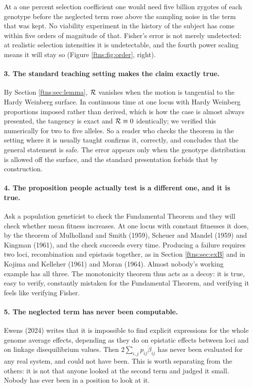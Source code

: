 At a one percent selection coefficient one would need five billion zygotes of each genotype before
the neglected term rose above the sampling noise in the term that was kept. No viability experiment
in the history of the subject has come within five orders of magnitude of that. Fisher's error is
not merely undetected: at realistic selection intensities it is undetectable, and the fourth power
scaling means it will stay so (Figure \ref{ftns:fig:order}, right).

\paragraph{3. The standard teaching setting makes the claim exactly true.}
By Section \ref{ftns:sec:lemma}, $\mathcal{R}$ vanishes when the motion is tangential to the Hardy Weinberg
surface. In continuous time at one locus with Hardy Weinberg proportions imposed rather than
derived, which is how the case is almost always presented, the tangency is exact and $\mathcal{R}\equiv0$
identically; we verified this numerically for two to five alleles. So a reader who checks the
theorem in the setting where it is usually taught confirms it, correctly, and concludes that the
general statement is safe. The error appears only when the genotype distribution is allowed off the
surface, and the standard presentation forbids that by construction.

\paragraph{4. The proposition people actually test is a different one, and it is true.}
Ask a population geneticist to check the Fundamental Theorem and they will check whether mean
fitness increases. At one locus with constant fitnesses it does, by the theorem of Mulholland and
Smith (1959), Scheuer and Mandel (1959) and Kingman (1961), and the check succeeds every time.
Producing a failure requires two loci, recombination and epistasis together, as in
Section \ref{ftns:sec:exB} and in Kojima and Kelleher (1961) and Moran (1964). Almost nobody's working
example has all three. The monotonicity theorem thus acts as a decoy: it is true, easy to verify,
constantly mistaken for the Fundamental Theorem, and verifying it feels like verifying Fisher.

\paragraph{5. The neglected term has never been computable.}
Ewens (2024) writes that it is impossible to find explicit expressions for the whole genome average
effects, depending as they do on epistatic effects between loci and on linkage disequilibrium
values. Then $2\sum_{i,j}p_{ij}\dot\beta_{ij}$ has never been evaluated for any real system, and
could not have been. This is worth separating from the others: it is not that anyone looked at the
second term and judged it small. Nobody has ever been in a position to look at it.

